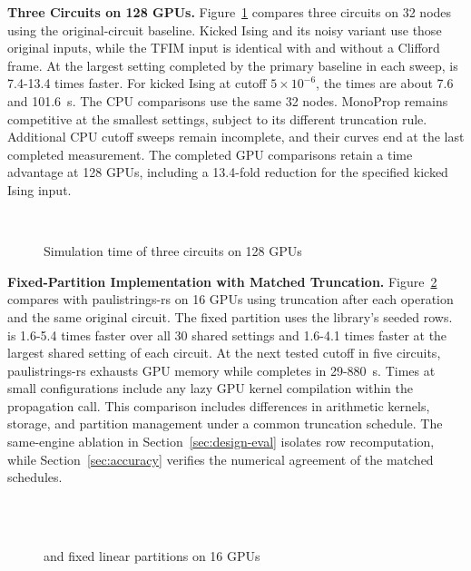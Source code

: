 \noindent\textbf{Three Circuits on 128 GPUs.}
Figure~\ref{fig:circuits128} compares three circuits on 32 nodes using the original-circuit \cuPP baseline.
Kicked Ising and its noisy variant use those original inputs, while the TFIM input is identical with and without a Clifford frame.
At the largest setting completed by the primary baseline in each sweep, \SectorQ is 7.4-13.4 times faster.
For kicked Ising at cutoff $5\times10^{-6}$, the times are about 7.6 and 101.6~s.
The CPU comparisons use the same 32 nodes.
MonoProp remains competitive at the smallest settings, subject to its different truncation rule.
Additional CPU cutoff sweeps remain incomplete, and their curves end at the last completed measurement.
The completed GPU comparisons retain a time advantage at 128 GPUs, including a 13.4-fold reduction for the specified kicked Ising input.

\begin{figure}[t]
\centering
{}\\[-2pt]
\hfill
{}\hfill
{}
\caption{Simulation time of three circuits on 128 GPUs}
\label{fig:circuits128}
\end{figure}

\noindent\textbf{Fixed-Partition Implementation with Matched Truncation.}
Figure~\ref{fig:prs} compares \SectorQ with paulistrings-rs on 16 GPUs using truncation after each operation and the same original circuit.
The fixed partition uses the library's seeded rows.
\SectorQ is 1.6-5.4 times faster over all 30 shared settings and 1.6-4.1 times faster at the largest shared setting of each circuit.
At the next tested cutoff in five circuits, paulistrings-rs exhausts GPU memory while \SectorQ completes in 29-880~s.
Times at small configurations include any lazy GPU kernel compilation within the propagation call.
This comparison includes differences in arithmetic kernels, storage, and partition management under a common truncation schedule.
The same-engine ablation in Section~\ref{sec:design-eval} isolates row recomputation, while Section~\ref{sec:accuracy} verifies the numerical agreement of the matched schedules.

\begin{figure}[t]
\centering
{}\\[-2pt]
\hfill
{}\hfill
{}\hfill
{}\\
\hfill
{}\hfill
{}
\caption{\SectorQ and fixed linear partitions on 16 GPUs}
\label{fig:prs}
\end{figure}

